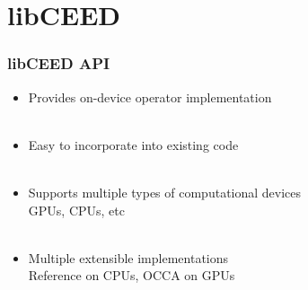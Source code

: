 \documentclass{beamer}
\begin{document}
\section{libCEED}

\begin{frame}
\begin{center}
\frametitle{libCEED API}

\begin{itemize}

\item Provides on-device operator implementation\\

~\\

\item Easy to incorporate into existing code\\

~\\

\item Supports multiple types of computational devices\\

\hspace{6mm} GPUs, CPUs, etc\\

~\\

\item Multiple extensible implementations\\

\hspace{6mm} Reference on CPUs, OCCA on GPUs

\end{itemize}

\end{center}
\end{frame}

\end{document}
